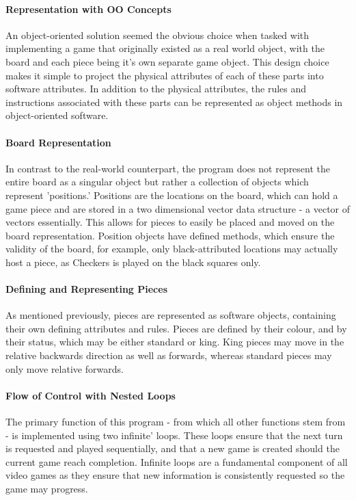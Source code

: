 \documentclass[10pt, a4paper]{article}
\begin{document}
	\paragraph{Representation with OO Concepts}
	An object-oriented solution seemed the obvious choice when tasked with implementing a game that originally existed as a real world object, with the board and each piece being it's own separate game object. This design choice makes it simple to project the physical attributes of each of these parts into software attributes. In addition to the physical attributes, the  rules and instructions associated with these parts can be represented as object methods in object-oriented software.
	\paragraph{Board Representation}
	In contrast to the real-world counterpart, the program does not represent the entire board as a singular object but rather a collection of objects which represent 'positions.' Positions are the locations on the board, which can hold a game piece and are stored in a two dimensional vector data structure - a vector of vectors essentially. 
	This allows for pieces to easily be placed and moved on the board representation. Position objects have defined methods, which ensure the validity of the board, for example, only black-attributed locations may actually host a piece, as Checkers is played on the black squares only.
	\paragraph{Defining and Representing Pieces}
	As mentioned previously, pieces are represented as software objects, containing their own defining attributes and rules. Pieces are defined by their colour, and by their status, which may be either standard or king. King pieces may move in the relative backwards direction as well as forwards, whereas standard pieces may only move relative forwards.
	\paragraph{Flow of Control with Nested Loops}
	The primary function of this program - from which all other functions stem from - is implemented using two infinite' loops. These loops ensure that the next turn is requested and played sequentially, and that a new game is created should the current game reach completion. Infinite loops are a fundamental component of all video games as they ensure that new information is consistently requested so the game may progress.
\end{document}
